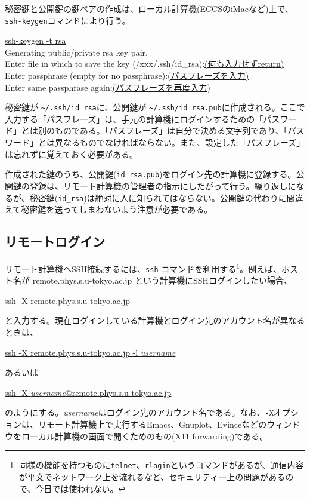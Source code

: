 秘密鍵と公開鍵の鍵ペアの作成は、ローカル計算機(ECCSのiMacなど)上で、{\tt ssh-keygen}コマンドにより行う。
\begin{commandline2}
\prompt \underline{ssh-keygen -t rsa} \\
Generating public/private rsa key pair.\\
Enter file in which to save the key (/xxx/.ssh/id\_rsa):\underline{(何も入力せずreturn)}\\
Enter passphrase (empty for no passphrase):\underline{(パスフレーズを入力)}\\
Enter same passphrase again:\underline{(パスフレーズを再度入力)}
\end{commandline2} \noindent
秘密鍵が {\tt \~{}/.ssh/id\_rsa}に、公開鍵が {\tt \~{}/.ssh/id\_rsa.pub}に作成される。ここで入力する「パスフレーズ」は、手元の計算機にログインするための「パスワード」とは別のものである。「パスフレーズ」は自分で決める文字列であり、「パスワード」とは異なるものでなければならない。また、設定した「パスフレーズ」は忘れずに覚えておく必要がある。

作成された鍵のうち、公開鍵({\tt id\_rsa.pub})をログイン先の計算機に登録する。公開鍵の登録は、リモート計算機の管理者の指示にしたがって行う。繰り返しになるが、秘密鍵({\tt id\_rsa})は絶対に人に知られてはならない。公開鍵の代わりに間違えて秘密鍵を送ってしまわないよう注意が必要である。

\subsection{リモートログイン}

リモート計算機へSSH接続するには、{\tt ssh} コマンドを利用する\footnote{同様の機能を持つものに{\tt telnet}、{\tt rlogin}というコマンドがあるが、通信内容が平文でネットワーク上を流れるなど、セキュリティー上の問題があるので、今日では使われない。}。例えば、ホスト名が remote.phys.s.u-tokyo.ac.jp という計算機にSSHログインしたい場合、
\begin{commandline2}
\prompt \underline{ssh -X remote.phys.s.u-tokyo.ac.jp}
\end{commandline2} \noindent
と入力する。現在ログインしている計算機とログイン先のアカウント名が異なるときは、
\begin{commandline2}
\prompt \underline{ssh -X remote.phys.s.u-tokyo.ac.jp -l {\it username}}
\end{commandline2} \noindent
あるいは
\begin{commandline2}
\prompt \underline{ssh -X {\it username}@remote.phys.s.u-tokyo.ac.jp}
\end{commandline2} \noindent
のようにする。{\it username}はログイン先のアカウント名である。なお、{\tt -X}オプションは、リモート計算機上で実行するEmacs、Gnuplot、Evinceなどのウィンドウをローカル計算機の画面で開くためのもの(X11 forwarding)である。

